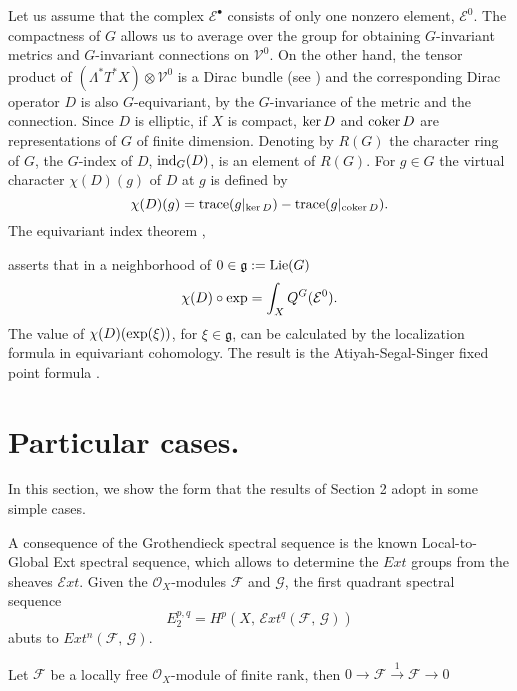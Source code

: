 \documentclass[xypic,amscd,syntonly,amssymb,verbatim,12pt]{amsart}
\theoremstyle{plain}
\theoremstyle{definition}
\theoremstyle{remark}
\numberwithin{equation}{section}
\begin{document}
 Let us assume that the complex ${\mathcal E}^{\bullet}$ consists of only one
 nonzero element,  ${\mathcal E}^0$. The compactness of $G$ allows us to average over the group
 for obtaining $G$-invariant metrics and $G$-invariant connections on ${\mathcal V}^0$. On the other hand,
 the tensor product of $(\Lambda^*T^*X) \otimes{\mathcal V}^0$ is a Dirac bundle (see \cite[page 122]{L-M}) and the corresponding Dirac operator $D$ is also $G$-equivariant,  by the $G$-invariance of the metric and the connection.
  Since $D$ is elliptic, if $X$ is compact, ${\rm ker} \, D$ and ${\rm coker} \, D$ are representations
  of $G$ of finite dimension. Denoting by $R(G)$ the character ring of $G$,  the $G$-index of $D$, ${\rm ind}_G(D)$, is an element of $R(G)$. For $g\in G$ the virtual character $\chi(D)(g)$ of $D$ at $g$ is defined by
  $$\chi(D)(g)={\rm trace}(g|_{{\rm ker}\,D})-{\rm trace}(g|_{{\rm coker}\,D}).$$
  The equivariant index theorem \cite[Chapter 8]{B-G-V},
  
  asserts that in a neighborhood of
   $0\in{\mathfrak g}:={\rm Lie}(G)$
  \begin{equation}\label{chi(D)}
   \chi(D)\circ{\rm exp}=\int_XQ^G({\mathcal E}^0).
   \end{equation}
 The value of $\chi(D)({\rm exp}(\xi))$, for $\xi\in{\mathfrak g}$,  can be calculated by the localization formula in
 equivariant cohomology. The result is the Atiyah-Segal-Singer
 fixed point formula \cite{B-G-V,L-M}.

 
 






\section{Particular cases.}

In this section, we show the form that the results of Section 2
adopt in some simple cases.

 A consequence of the Grothendieck spectral
sequence \cite[page 207]{Ge-Ma} is the known Local-to-Global Ext
spectral sequence, which allows to determine the $Ext$ groups from
the sheaves ${\mathcal Ext}$. Given the ${\mathcal O}_X$-modules
${\mathcal F}$ and ${\mathcal G}$, the first quadrant spectral
sequence
$$E_2^{p,q}=H^p(X,\,{\mathcal Ext}^q({\mathcal F},\,{\mathcal G}))$$
abuts to $Ext^n({\mathcal F},\,{\mathcal G})$.

 Let ${\mathcal F}$ be a locally free ${\mathcal O}_X$-module of finite rank, then
  $0\to{\mathcal F} \stackrel{1}{\to } {\mathcal F} \to 0$
 
\end{document}
